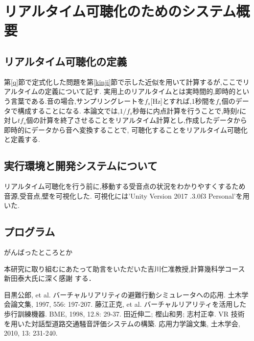\documentclass[dvipdfmx]{ampbt}
\begin{document}
\section{リアルタイム可聴化のためのシステム概要}
\subsection{リアルタイム可聴化の定義}
第\ref{q}節で定式化した問題を第\ref{kinji}節で示した近似を用いて計算するが,ここでリアルタイムの定義について記す.
実用上のリアルタイムとは実時間的,即時的という言葉である.音の場合,サンプリングレートを$f_s$[Hz]とすれば,1秒間を$f_s$個のデータで構成することになる.
本論文では,$1/f_s$秒毎に内点計算を行うことで,時刻$t$に対し$tf_s$個の計算を終了させることをリアルタイム計算とし,作成したデータから即時的にデータから音へ変換することで,
可聴化することをリアルタイム可聴化と定義する.

\subsection{実行環境と開発システムについて}
リアルタイム可聴化を行う前に,移動する受音点の状況をわかりやすくするため音源,受音点,壁を可視化した.
可視化には'Unity Version 2017 .3.0f3 Personal'を用いた.
\subsection{プログラム}
がんばったところとか




\clearpage
\acknowledgment
本研究に取り組むにあたって助言をいただいた吉川仁准教授,計算幾科学コース新田泰大氏に深く感謝
する．

\begin{thebibliography}{10}
目黒公郎, et al. バーチャルリアリティの避難行動シミュレータへの応用. 土木学会論文集, 1997, 556: 197-207.
藤江正克, et al. バーチャルリアリティを活用した歩行訓練機器. BME, 1998, 12.8: 29-37.
田近伸二; 樫山和男; 志村正幸. VR 技術を用いた対話型道路交通騒音評価システムの構築. 応用力学論文集, 土木学会, 2010, 13: 231-240.
\end{thebibliography}
\end{document}

